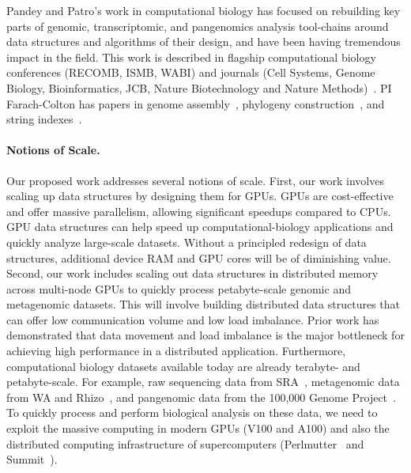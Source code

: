 \begin{description}
    \item[Large-scale computational biology (PIs Bender, Farach-Colton, Pandey, and Patro)] Pandey and Patro's work in computational biology has focused on rebuilding key parts of genomic, transcriptomic, and pangenomics analysis tool-chains around data structures and algorithms of their design, and have been having tremendous impact in the field. This work is described in flagship computational biology conferences (RECOMB, ISMB, WABI) and journals (Cell Systems, Genome Biology, Bioinformatics, JCB, Nature Biotechnology and Nature Methods)~\cite{PandeyABFJP18Cell,PandeyBJP17a,PandeyBJP17b,AlmodaresiPFJP19,AlmodaresiPFJP20,pandey2021variantstore,almodaresi2017rainbowfish,almodaresi2022incrementally,PatroSailfish:2014,Patro2017Salmon,Srivastava2019,he2022alevin,Almodaresi2018Pufferfish,Almodaresi2021}.  PI Farach-Colton has papers in genome assembly~\cite{Choi2003}, phylogeny construction~\cite{Farach97,Ambainis97,FarachKKM97,Farach1999, Cohen1997}, and string indexes~\cite{Farach97,Ambainis97}.

\end{description}


\paragraph{Notions of Scale.}
Our proposed work addresses several notions of scale.
First, our work involves scaling up data structures by designing them for GPUs. GPUs are cost-effective and offer massive parallelism, allowing significant speedups compared to CPUs. GPU data structures can help speed up computational-biology applications
and quickly analyze large-scale datasets. Without a principled redesign of data structures, additional device RAM and GPU cores will be of diminishing value.
Second, our work includes scaling out data structures in distributed memory across multi-node GPUs to quickly process petabyte-scale genomic and metagenomic datasets. This will involve building distributed data structures that can offer low communication volume and low load imbalance. Prior work has demonstrated that data movement and load imbalance is the major bottleneck for achieving high performance in a distributed application.
Furthermore, computational biology datasets available today are already terabyte- and petabyte-scale. For example, raw sequencing data from SRA~\cite{kodama2012sequence}, metagenomic data from WA and Rhizo~\cite{hofmeyr2020terabase}, and pangenomic data from the 100,000 Genome Project~\cite{1002021100}. 
To quickly process and perform biological analysis on these data, we need to exploit the massive computing in modern GPUs (V100 and A100) and also the distributed computing infrastructure of supercomputers (Perlmutter~\cite{perlmutter} and Summit~\cite{summit}).
